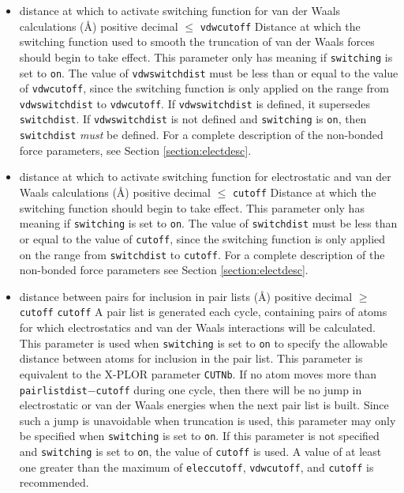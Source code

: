 \begin{itemize}
\item
{}%
{distance at which to activate switching function 
for van der Waals calculations (\AA)}%
{positive decimal $\leq$ \verb!vdwcutoff!}%
{Distance at which the switching function
used to smooth the truncation of
van der Waals forces should begin to take effect.  
This parameter only has meaning if \verb!switching! is 
set to \verb!on!.  
The value of \verb!vdwswitchdist! must be less than
or equal to the value of \verb!vdwcutoff!, since the switching function
is only applied on the range from \verb!vdwswitchdist! to \verb!vdwcutoff!.
If \verb!vdwswitchdist! is defined, it supersedes \verb!switchdist!.
If \verb!vdwswitchdist! is not defined and \verb!switching! is
\verb!on!, then \verb !switchdist! {\em must} be defined.
For a complete description of the non-bonded force parameters, see
Section \ref{section:electdesc}.
}

\item
{}%
{distance at which to activate switching function 
for electrostatic and van der Waals calculations (\AA)}%
{positive decimal $\leq$ \verb!cutoff!}%
{Distance at which the switching function
should begin to take effect.  
This parameter only has meaning if \verb!switching! is 
set to \verb!on!.  
The value of \verb!switchdist! must be less than
or equal to the value of \verb!cutoff!, since the switching function
is only applied on the range from \verb!switchdist! to \verb!cutoff!.  
For a complete description of the non-bonded force parameters see
Section \ref{section:electdesc}.}

\item
{}%
{distance between pairs for inclusion in pair lists (\AA)}%
{positive decimal $\geq$ \verb!cutoff!}%
{\verb!cutoff!}%
{%
A pair list is generated each cycle, 
containing pairs of atoms for which 
electrostatics and van der Waals interactions will be calculated.
This parameter is used when \verb!switching! is set to \verb!on! to
specify the allowable distance between atoms for inclusion in the
pair list.  
This parameter is equivalent to the X-PLOR parameter \verb!CUTNb!.
If no atom moves more than \verb!pairlistdist!$-$\verb!cutoff! during
one cycle, then there will be no jump in electrostatic or van der
Waals energies when the next pair list is built.  Since such a jump
is unavoidable when truncation is used, this parameter may only
be specified when \verb!switching! is set to \verb!on!.  If this
parameter is not specified and \verb!switching! is set to \verb!on!,
the value of \verb!cutoff! is used.  
A value of at least one greater than the maximum of 
\verb!eleccutoff!, \verb!vdwcutoff!, and \verb!cutoff! 
is recommended.  
}


\end{itemize}
